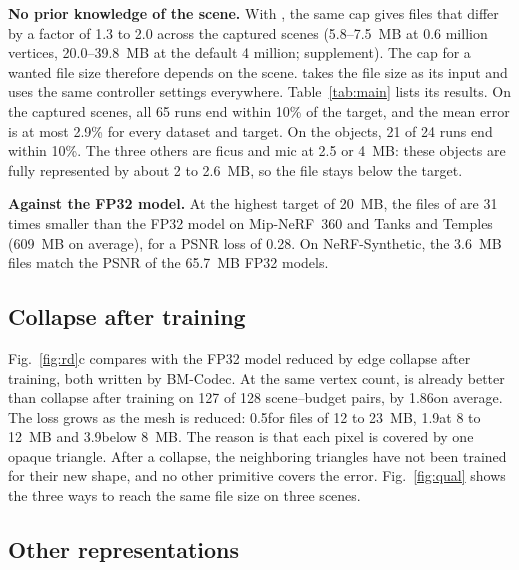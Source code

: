 \noindent\textbf{No prior knowledge of the scene.} With \MSc, the same cap gives files that differ by a factor of 1.3 to 2.0 across the captured scenes (5.8--7.5~MB at 0.6 million vertices, 20.0--39.8~MB at the default 4 million; supplement). The cap for a wanted file size therefore depends on the scene. \BM takes the file size as its input and uses the same controller settings everywhere. Table~\ref{tab:main} lists its results. On the captured scenes, all 65 runs end within 10\% of the target, and the mean error is at most 2.9\% for every dataset and target. On the objects, 21 of 24 runs end within 10\%. The three others are ficus and mic at 2.5 or 4~MB: these objects are fully represented by about 2 to 2.6~MB, so the file stays below the target.

\noindent\textbf{Against the FP32 model.} At the highest target of 20~MB, the files of \BM are 31 times smaller than the FP32 model on Mip-NeRF~360 and Tanks and Temples (609~MB on average), for a PSNR loss of 0.28\dB. On NeRF-Synthetic, the 3.6~MB files match the PSNR of the 65.7~MB FP32 models.

\subsection{Collapse after training}
\label{sec:simp}
Fig.~\ref{fig:rd}c compares \BM with the FP32 model reduced by edge collapse after training, both written by BM-Codec. At the same vertex count, \MSc is already better than collapse after training on 127 of 128 scene--budget pairs, by 1.86\dB on average. The loss grows as the mesh is reduced: 0.5\dB for files of 12 to 23~MB, 1.9\dB at 8 to 12~MB and 3.9\dB below 8~MB. The reason is that each pixel is covered by one opaque triangle. After a collapse, the neighboring triangles have not been trained for their new shape, and no other primitive covers the error. Fig.~\ref{fig:qual} shows the three ways to reach the same file size on three scenes.

\subsection{Other representations}
\label{sec:cross}

